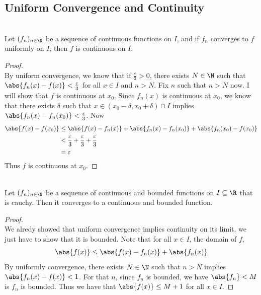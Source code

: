 \documentclass[a4paper]{article}
\begin{document}
\subsection{Uniform Convergence and Continuity}
\begin{thm}{}{}\\ Let $(f_n)_{n\in\N}$ be a sequence of continuous functions on $I$, and if $f_n$ converges to $f$ uniformly on $I$, then $f$ is continuous on $I$. 
\begin{proof}\\ By uniform convergence, we know that if $\frac{\varepsilon}{3}>0$, there exists $N\in\N$ such that $\abs{f_n(x)-f(x)}<\frac{\varepsilon}{3}$ for all $x\in I$ and $n>N$. Fix $n$ such that $n>N$ now. I will show that $f$ is continuous at $x_0$. Since $f_n(x)$ is continuous at $x_0$, we know that there exists $\delta$ such that $x\in(x_0-\delta,x_0+\delta)\cap I$ implies $\abs{f_n(x)-f_n(x_0)}<\frac{\varepsilon}{3}$. Now
\begin{align*}
\abs{f(x)-f(x_0)}&\leq\abs{f(x)-f_n(x)}+\abs{f_n(x)-f_n(x_0)}+\abs{f_n(x_0)-f(x_0)}\\
&<\frac{\varepsilon}{3}+\frac{\varepsilon}{3}+\frac{\varepsilon}{3}\\
&=\varepsilon
\end{align*}
Thus $f$ is continuous at $x_0$. 
\end{proof}
\end{thm}

\begin{prp}{}{}\\ Let $(f_n)_{n\in\N}$ be a sequence of continuous and bounded functions on $I\subseteq\R$ that is cauchy. Then it converges to a continuous and bounded function. 
\begin{proof}\\ We alredy showed that uniform convergence implies continuity on its limit, we just have to show that it is bounded. Note that for all $x\in I$, the domain of $f$, $$\abs{f(x)}\leq\abs{f(x)-f_n(x)}+\abs{f_n(x)}$$ By uniformly convergence, there exists $N\in\N$ such that $n>N$ implies $\abs{f_n(x)-f(x)}<1$. For that $n$, since $f_n$ is bounded, we have $\abs{f_n}<M$ is $f_n$ is bounded. Thus we have that $\abs{f(x)}\leq M+1$ for all $x\in I$. 
\end{proof}
\end{prp}
\end{document}
